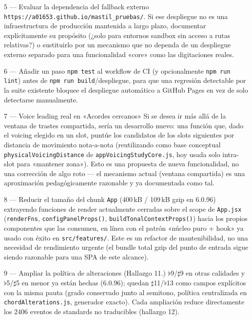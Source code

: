 \documentclass[a4paper,11pt,oneside]{report}
\newcommand{\flt}{\ensuremath{\flat}}
\newcommand{\shp}{\ensuremath{\sharp}}
\begin{document}
\begin{recobox}{5 --- Evaluar la dependencia del fallback externo}
\lstinline!https://a01653.github.io/mastil_pruebas/!. Si ese despliegue no es una infraestructura de producción mantenida a largo plazo, documentar explícitamente su propósito (¿solo para entornos sandbox sin acceso a rutas relativas?) o sustituirlo por un mecanismo que no dependa de un despliegue externo separado para una funcionalidad «core» como las digitaciones reales.
\end{recobox}

\begin{recobox}{6 --- Añadir un paso \texttt{npm test} al workflow de CI}
(y opcionalmente \lstinline!npm run lint!) antes de \lstinline!npm run build!/despliegue, para que una regresión detectable por la suite existente bloquee el despliegue automático a GitHub Pages en vez de solo detectarse manualmente.
\end{recobox}

\begin{recobox}{7 --- Voice leading real en «Acordes cercanos»}
Si se desea ir más allá de la ventana de trastes compartida, sería un desarrollo nuevo: una función que, dado el voicing elegido en un slot, puntúe los candidatos de los slots siguientes por distancia de movimiento nota-a-nota (reutilizando como base conceptual \lstinline!physicalVoicingDistance! de \lstinline!appVoicingStudyCore.js!, hoy usada solo intra-slot para «mantener zona»). Esto es una propuesta de nueva funcionalidad, no una corrección de algo roto --- el mecanismo actual (ventana compartida) es una aproximación pedagógicamente razonable y ya documentada como tal.
\end{recobox}

\begin{recobox}{8 --- Reducir el tamaño del chunk \texttt{App}}
(400\,kB / 109\,kB gzip en 6.0.96) extrayendo funciones de render actualmente cerradas sobre el scope de \lstinline!App.jsx! (\lstinline!renderFns!, \lstinline!configPanelProps()!, \lstinline!buildTonalContextProps()!) hacia los propios componentes que las consumen, en línea con el patrón «núcleo puro + hook» ya usado con éxito en \lstinline!src/features/!. Este es un refactor de mantenibilidad, no una necesidad de rendimiento urgente (el bundle total gzip del punto de entrada sigue siendo razonable para una SPA de este alcance).
\end{recobox}

\begin{recobox}{9 --- Ampliar la política de alteraciones}
(Hallazgo 11.) \flt9/\shp9 en otras calidades y \flt5/\shp5 en menor ya están hechas (6.0.96); quedan \shp11/\flt13 como campos explícitos con la misma pauta (grado conservado junto al semitono, política centralizada en \lstinline!chordAlterations.js!, generador exacto). Cada ampliación reduce directamente los 2406 eventos de standards no traducibles (hallazgo 12).
\end{recobox}
\end{document}
